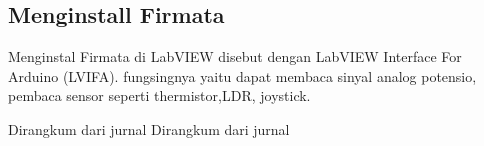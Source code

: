 	\subsection{Menginstall Firmata}
	Menginstal Firmata di LabVIEW disebut dengan LabVIEW Interface For Arduino (LVIFA). fungsingnya yaitu dapat membaca sinyal analog potensio,
	pembaca sensor seperti thermistor,LDR, joystick.
	
	Dirangkum dari jurnal \cite{steiner2009firmata}
	Dirangkum dari jurnal \cite{majocchi2012arduino}